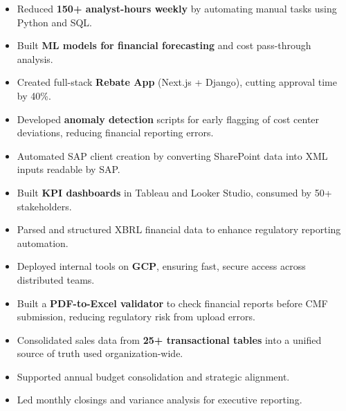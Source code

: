 \documentclass[10pt,a4paper]{altacv} %
\begin{document}

\makecvheader 


\begin{paracol}{2}


\begin{itemize}
\item Reduced \textbf{150+ analyst-hours weekly} by automating manual tasks using Python and SQL.
\item Built \textbf{ML models for financial forecasting} and cost pass-through analysis.
\item Created full-stack \textbf{Rebate App} (Next.js + Django), cutting approval time by 40\%.
\item Developed \textbf{anomaly detection} scripts for early flagging of cost center deviations, reducing financial reporting errors.
\item Automated SAP client creation by converting SharePoint data into XML inputs readable by SAP.
\item Built \textbf{KPI dashboards} in Tableau and Looker Studio, consumed by 50+ stakeholders.
\item Parsed and structured XBRL financial data to enhance regulatory reporting automation.
\item Deployed internal tools on \textbf{GCP}, ensuring fast, secure access across distributed teams.
\item Built a \textbf{PDF-to-Excel validator} to check financial reports before CMF submission, reducing regulatory risk from upload errors.
\item Consolidated sales data from \textbf{25+ transactional tables} into a unified source of truth used organization-wide.
\end{itemize}
\divider

\begin{itemize}
\item Supported annual budget consolidation and strategic alignment.
\item Led monthly closings and variance analysis for executive reporting.
\end{itemize}
\divider


\end{paracol}
\end{document}
